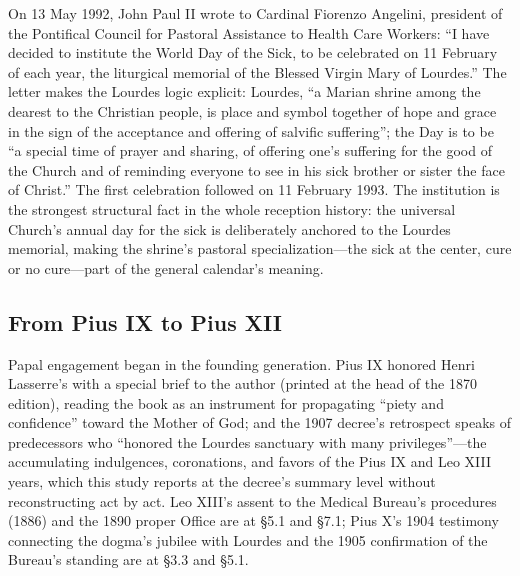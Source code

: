On 13 May 1992, John Paul II wrote to Cardinal Fiorenzo Angelini,
president of the Pontifical Council for Pastoral Assistance to
Health Care Workers: ``I have decided to institute the World Day
of the Sick, to be celebrated on 11 February of each year, the
liturgical memorial of the Blessed Virgin Mary of Lourdes.'' The
letter makes the Lourdes logic explicit: Lourdes, ``a Marian
shrine among the dearest to the Christian people, is place and
symbol together of hope and grace in the sign of the acceptance
and offering of salvific suffering''; the Day is to be ``a
special time of prayer and sharing, of offering one's suffering
for the good of the Church and of reminding everyone to see in
his sick brother or sister the face of Christ.'' The first
celebration followed on 11 February 1993.
The institution is the strongest structural fact in the whole
reception history: the universal Church's annual day for the sick
is deliberately anchored to the Lourdes memorial, making the
shrine's pastoral specialization---the sick at the center, cure
or no cure---part of the general calendar's meaning.

\subsection{From Pius IX to Pius XII}

Papal engagement began in the founding generation. Pius IX
honored Henri Lasserre's  with a
special brief to the author (printed at the head of the 1870
edition), reading the book as an instrument for propagating
``piety and confidence'' toward the Mother of God; and the 1907
decree's retrospect speaks of predecessors who ``honored the
Lourdes sanctuary with many privileges''---the accumulating
indulgences, coronations, and favors of the Pius IX and Leo XIII
years, which this study reports at the decree's summary level
without reconstructing act by act. Leo
XIII's assent to the Medical Bureau's procedures (1886) and the
1890 proper Office are at \S5.1 and \S7.1; Pius X's 1904
testimony connecting the dogma's jubilee with Lourdes and the
1905 confirmation of the Bureau's standing are at \S3.3 and
\S5.1.

